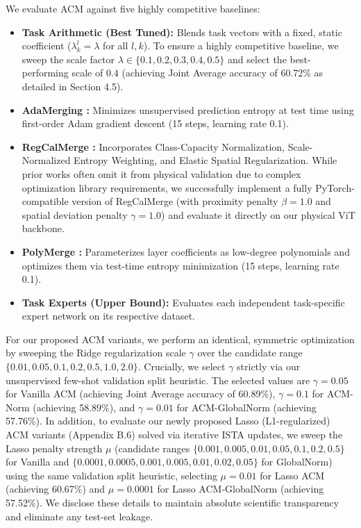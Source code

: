 We evaluate ACM against five highly competitive baselines:
\begin{itemize}
    \item \textbf{Task Arithmetic (Best Tuned):} Blends task vectors with a fixed, static coefficient ($\lambda_k^l = \lambda$ for all $l, k$). To ensure a highly competitive baseline, we sweep the scale factor $\lambda \in \{0.1, 0.2, 0.3, 0.4, 0.5\}$ and select the best-performing scale of $0.4$ (achieving Joint Average accuracy of 60.72\% as detailed in Section 4.5).
    \item \textbf{AdaMerging \cite{yang2023adamerging}:} Minimizes unsupervised prediction entropy at test time using first-order Adam gradient descent (15 steps, learning rate 0.1).
    \item \textbf{RegCalMerge \cite{regcalmerge}:} Incorporates Class-Capacity Normalization, Scale-Normalized Entropy Weighting, and Elastic Spatial Regularization. While prior works often omit it from physical validation due to complex optimization library requirements, we successfully implement a fully PyTorch-compatible version of RegCalMerge (with proximity penalty $\beta = 1.0$ and spatial deviation penalty $\gamma = 1.0$) and evaluate it directly on our physical ViT backbone.
    \item \textbf{PolyMerge \cite{polymerge}:} Parameterizes layer coefficients as low-degree polynomials and optimizes them via test-time entropy minimization (15 steps, learning rate 0.1).
    \item \textbf{Task Experts (Upper Bound):} Evaluates each independent task-specific expert network on its respective dataset.
\end{itemize}

For our proposed ACM variants, we perform an identical, symmetric optimization by sweeping the Ridge regularization scale $\gamma$ over the candidate range $\{0.01, 0.05, 0.1, 0.2, 0.5, 1.0, 2.0\}$. Crucially, we select $\gamma$ strictly via our unsupervised few-shot validation split heuristic. The selected values are $\gamma = 0.05$ for Vanilla ACM (achieving Joint Average accuracy of 60.89\%), $\gamma = 0.1$ for ACM-Norm (achieving 58.89\%), and $\gamma = 0.01$ for ACM-GlobalNorm (achieving 57.76\%). In addition, to evaluate our newly proposed Lasso (L1-regularized) ACM variants (Appendix B.6) solved via iterative ISTA updates, we sweep the Lasso penalty strength $\mu$ (candidate ranges $\{0.001, 0.005, 0.01, 0.05, 0.1, 0.2, 0.5\}$ for Vanilla and $\{0.0001, 0.0005, 0.001, 0.005, 0.01, 0.02, 0.05\}$ for GlobalNorm) using the same validation split heuristic, selecting $\mu = 0.01$ for Lasso ACM (achieving 60.67\%) and $\mu = 0.0001$ for Lasso ACM-GlobalNorm (achieving 57.52\%). We disclose these details to maintain absolute scientific transparency and eliminate any test-set leakage.

